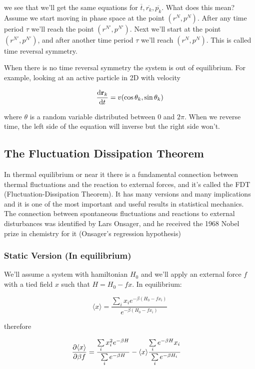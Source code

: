 we see that we'll get the same equations for $\overline{t}, \overline{r_k}, \overline{p_k}$. What does this mean? Assume we start moving in phase space at the point $(r^N,p^N)$. After any time period $\tau$ we'll reach the point $(r^{N'},p^{N'})$. Next we'll start at the point $(r^{N'},p^{N'})$, and after another time period $\tau$ we'll reach $(r^N,p^N)$. This is called time reversal symmetry.

When there is no time reversal symmetry the system is out of equilibrium. For example, looking at an active particle in 2D with velocity

\begin{align}
	\diff{\vec r_k}{t} = v(\cos\theta_k,\sin\theta_k)
\end{align}

where $\theta$ is a random variable distributed between $0$ and $2\pi$. When we reverse time, the left side of the equation will inverse but the right side won't.

\newpage
\subsection{The Fluctuation Dissipation Theorem}

In thermal equilibrium or near it there is a fundamental connection between thermal fluctuations and the reaction to external forces, and it's called the FDT (Fluctuation-Dissipation Theorem). It has many versions and many implications and it is one of the most important and useful results in statistical mechanics. The connection between spontaneous fluctuations and reactions to external disturbances was identified by Lars Onsager, and he received the 1968 Nobel prize in chemistry for it (Onsager's regression hypothesis)

\subsubsection{Static Version (In equilibrium)}

We'll assume a system with hamiltonian $H_0$ and we'll apply an external force $f$ with a tied field $x$ such that $H=H_0-fx$. In equilibrium:

\begin{equation}
	\langle x \rangle = \frac{\sum\limits_i x_i e^{-\beta(H_0-fx_i)}}{e^{-\beta (H_0-fx_i)}}
\end{equation}

therefore

\begin{align}
	\diffp{\langle x \rangle}{\beta f} &= \frac{\sum\limits_i x_i^2 e^{-\beta H}}{\sum\limits_i e^{-\beta H}} - \langle x \rangle \frac{\sum\limits_i e^{-\beta H} x_i}{\sum\limits_i e^{-\beta H_i}}
\end{align}

